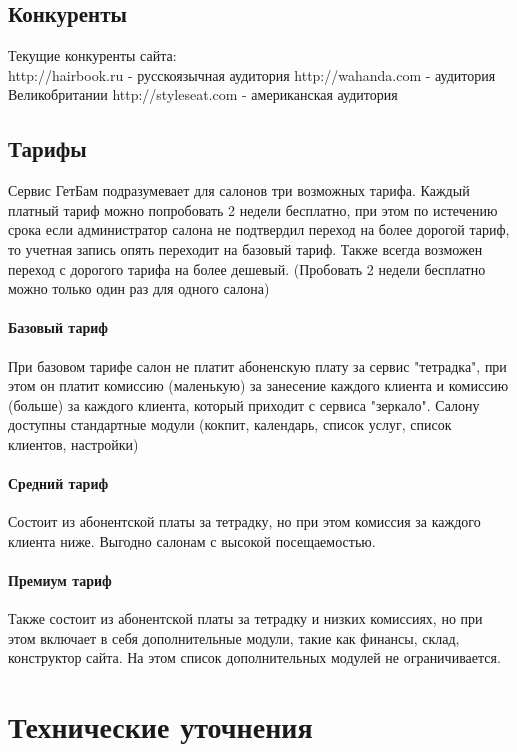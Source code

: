 \documentclass[DIV=calc, paper=a4, fontsize=11pt]{scrartcl} %
\begin{document}
\subsection{Конкуренты}
Текущие конкуренты сайта:
\\[0.5cm]
http://hairbook.ru - русскоязычная аудитория
\newline http://wahanda.com - аудитория Великобритании
\newline http://styleseat.com - американская аудитория

\subsection{Тарифы} \label{subsec:tariffs}
Сервис ГетБам подразумевает для салонов три возможных тарифа. Каждый платный тариф можно попробовать 2 недели бесплатно, при этом по истечению срока если администратор салона не подтвердил переход на более дорогой тариф, то учетная запись опять переходит на базовый тариф. Также всегда возможен переход с дорогого тарифа на более дешевый. (Пробовать 2 недели бесплатно можно только один раз для одного салона)

\paragraph{Базовый тариф}
При базовом тарифе салон не платит абоненскую плату за сервис "тетрадка", при этом он платит комиссию (маленькую) за занесение каждого клиента и комиссию (больше) за каждого клиента, который приходит с сервиса "зеркало". Салону доступны стандартные модули (кокпит, календарь, список услуг, список клиентов, настройки)

\paragraph{Средний тариф}
Состоит из абонентской платы за тетрадку, но при этом комиссия за каждого клиента ниже. Выгодно салонам с высокой посещаемостью.

\paragraph{Премиум тариф}
Также состоит из абонентской платы за тетрадку и низких комиссиях, но при этом включает в себя дополнительные модули, такие как финансы, склад, конструктор сайта. На этом список дополнительных модулей не ограничивается.

\section{Технические уточнения}
\end{document}
